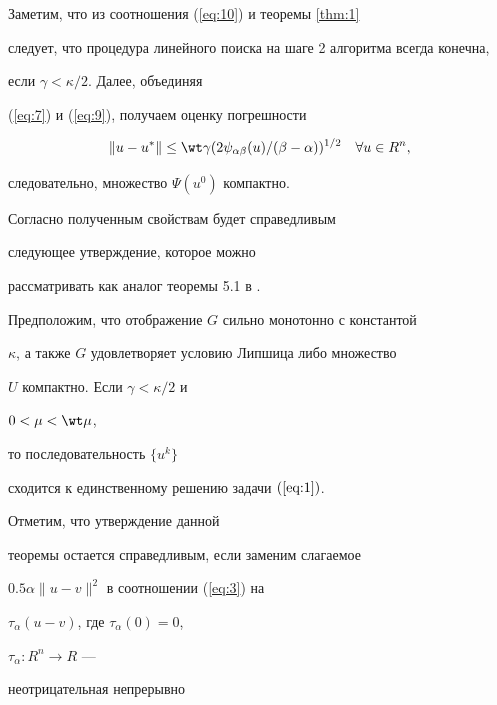 Заметим, что из соотношения (\ref{eq:10}) и теоремы \ref{thm:1}


следует, что процедура линейного поиска на шаге 2 алгоритма всегда конечна,


если $ \gamma < \kappa /2$. Далее, объединяя 


(\ref{eq:7}) и (\ref{eq:9}), получаем оценку погрешности


$$


\| u - u^{*} \| \leq \wt \gamma


( 2 \psi_{\alpha \beta }(u)/ (\beta -\alpha ))^{1/2}


\quad \forall u \in R^{n},


$$


следовательно, множество $ \Psi (u^{0})$ компактно.





Согласно полученным свойствам будет справедливым


следующее утверждение, которое можно 


рассматривать как аналог теоремы 5.1 в \cite{YTF97}.





\begin{thm} \label{thm:2}


Предположим, что отображение $G$ сильно монотонно с константой 


$ \kappa $, а также $G$ удовлетворяет условию Липшица либо множество 


$U$ компактно. Если $ \gamma < \kappa /2$ и


$ 0< \mu < \wt \mu$,


то последовательность $\{ u^{k} \}$ 


сходится к единственному решению задачи $(\ref{eq:1})$.


\end{thm}





Отметим, что утверждение данной 


теоремы остается справедливым, если заменим слагаемое 


$0.5 \alpha \| u -v \|^2 $ в соотношении (\ref{eq:3}) на


$\tau_{\alpha }(u-v)$, где $\tau_{\alpha }(0)=0$,


$\tau_{\alpha } : R^{n} \rightarrow R$ ---


неотрицательная непрерывно 


